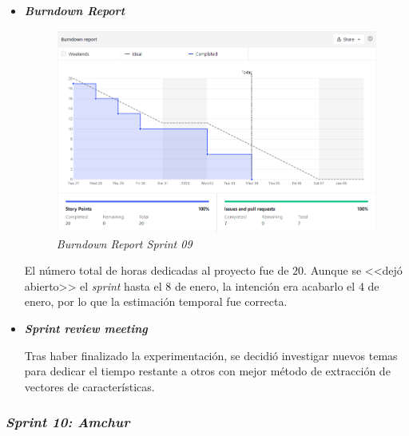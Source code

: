 \begin{itemize}
	\item \textbf{\textit{Burndown Report}}
	\begin{figure}[h]
		\caption[\textit{Sprint} 09: \textit{burndown report}]{\textit{Burndown Report Sprint 09}}
		\centering
		\includegraphics[width=\textwidth]{../img/anexos/bdr/s09_bdr}
	\end{figure}
	
	El número total de horas dedicadas al proyecto fue de $20$. Aunque se <<dejó abierto>> el \textit{sprint} hasta el 8 de enero, la intención era acabarlo el 4 de enero, por lo que la estimación temporal fue correcta.
	
	\item \textbf{\textit{Sprint review meeting}}
	
	Tras haber finalizado la experimentación, se decidió investigar nuevos temas para dedicar el tiempo restante a otros con mejor método de extracción de vectores de características.
	
\end{itemize}

\subsubsection{\textit{Sprint 10: Amchur}}

